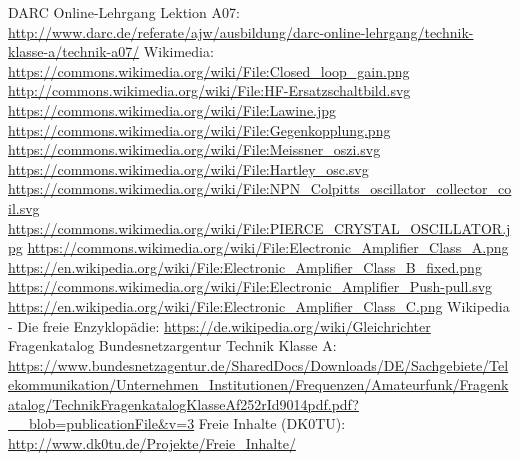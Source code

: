 \begin{thebibliography}{}
      DARC Online-Lehrgang Lektion A07:
                    \url{http://www.darc.de/referate/ajw/ausbildung/darc-online-lehrgang/technik-klasse-a/technik-a07/}
     	Wikimedia:
                    \url{https://commons.wikimedia.org/wiki/File:Closed_loop_gain.png}
                    \url{http://commons.wikimedia.org/wiki/File:HF-Ersatzschaltbild.svg}
                    \url{https://commons.wikimedia.org/wiki/File:Lawine.jpg}
                    \url{https://commons.wikimedia.org/wiki/File:Gegenkopplung.png}
                    \url{https://commons.wikimedia.org/wiki/File:Meissner_oszi.svg}
                    \url{https://commons.wikimedia.org/wiki/File:Hartley_osc.svg}
                    \url{https://commons.wikimedia.org/wiki/File:NPN_Colpitts_oscillator_collector_coil.svg}
                    \url{https://commons.wikimedia.org/wiki/File:PIERCE_CRYSTAL_OSCILLATOR.jpg}
                    \url{https://commons.wikimedia.org/wiki/File:Electronic_Amplifier_Class_A.png}
                    \url{https://en.wikipedia.org/wiki/File:Electronic_Amplifier_Class_B_fixed.png}
                    \url{https://commons.wikimedia.org/wiki/File:Electronic_Amplifier_Push-pull.svg}
                    \url{https://en.wikipedia.org/wiki/File:Electronic_Amplifier_Class_C.png}
                    \url{}
                    \url{}
                    \url{}
                    \url{}
        Wikipedia - Die freie Enzyklopädie:
                    \url{https://de.wikipedia.org/wiki/Gleichrichter}
	   Fragenkatalog Bundesnetzargentur Technik Klasse A:                   
                    \url{https://www.bundesnetzagentur.de/SharedDocs/Downloads/DE/Sachgebiete/Telekommunikation/Unternehmen_Institutionen/Frequenzen/Amateurfunk/Fragenkatalog/TechnikFragenkatalogKlasseAf252rId9014pdf.pdf?__blob=publicationFile&v=3}
        Freie Inhalte (DK0TU):
                    \url{http://www.dk0tu.de/Projekte/Freie_Inhalte/}
\end{thebibliography} 


